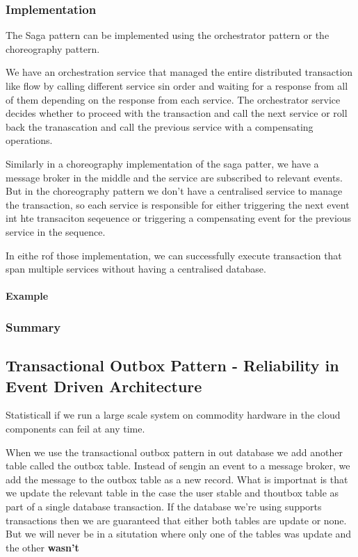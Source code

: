 \documentclass[a4paper, 11pt]{book}
\begin{document}
    \subsubsection{Implementation}
    The Saga pattern can be implemented using the orchestrator pattern or the choreography pattern.

    We have an orchestration service that managed the entire distributed transaction like flow by calling different service sin order and waiting for a response from all of them depending on the response from each service.
    The orchestrator service decides whether to proceed with the transaction and call the next service or roll back the tranascation and call the previous service with a compensating operations.

    Similarly in a choreography implementation of the saga patter, we have a message broker in the middle and the service are subscribed to relevant events.
    But in the choreography pattern we don't have a centralised service to manage the transaction, so each service is responsible for either triggering the next event int hte transaciton seqeuence or triggering a compensating event for the previous service in the sequence.

    In eithe rof those implementation, we can successfully execute transaction that span multiple services without having a centralised database.

    \paragraph{Example}

    \subsubsection{Summary}

    \subsection{Transactional Outbox Pattern - Reliability in Event Driven Architecture}
    Statisticall if we run a large scale system on commodity hardware in the cloud components can feil at any time.

    When we use the transactional outbox pattern in out database we add another table called the outbox table.
    Instead of sengin an event to a message broker, we add the message to the outbox table as a new record.
    What is importnat is that we update the relevant table in the case the user stable and thoutbox table as part of a single database transaction.
    If the database we're using supports transactions then we are guaranteed that either both tables are update or none.
    But we will never be in a situtation where only one of the tables was update and the other \textbf{wasn't}
\end{document}
